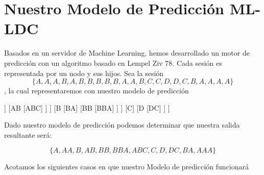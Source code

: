 \section{Nuestro Modelo de Predicción ML-LDC}






Basados en un servidor de Machine Learning, hemos desarrollado un motor de predicción con un algoritmo basado en Lempel Ziv 78. Cada sesión es representada por un nodo y sus hijos. Sea la sesión \begin{equation}
\{ A,A,A,B,A,B,B,B,B,B,A,A,B,C,C,D,D,C,B,A,A,A,A \}
\end{equation}, la cual representaremos con nuestro modelo de predicción


	\begin{forest} 
	[ $\epsilon$
		[A
			[AA
				[AAA]	
			]
			[AB
				[ABC]
			]
		]
		[B
			[BA]
			[BB
				[BBA]
			]
		]
		[C]
		[D
			[DC]
		]
	]
	\end{forest}

Dado nuestro modelo de predicción podemos determinar que nuestra salida resultante será:

\begin{equation}
\{ A,AA,B,AB,BB,BBA,ABC,C,D,DC,BA,AAA \}
\end{equation}


Acotamos los siguientes casos en que nuestro Modelo de predicción funcionará


